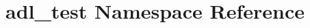 \hypertarget{namespaceadl__test}{}\section{adl\+\_\+test Namespace Reference}
\label{namespaceadl__test}
